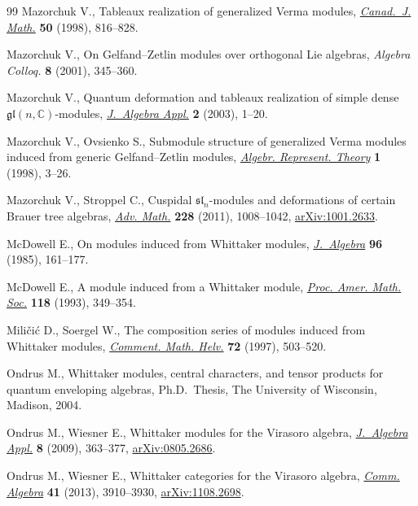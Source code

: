 \documentclass[pdftex]{sigma}
\begin{document}
\begin{thebibliography}{99}
Mazorchuk V., Tableaux realization of generalized {V}erma modules,
  \href{http://dx.doi.org/10.4153/CJM-1998-043-x}{\textit{Canad.~J. Math.}} \textbf{50} (1998), 816--828.

Mazorchuk V., On {G}elfand--{Z}etlin modules over orthogonal {L}ie algebras,
  \textit{Algebra Colloq.} \textbf{8} (2001), 345--360.

Mazorchuk V., Quantum deformation and tableaux realization of simple dense
  {${\mathfrak{gl}}(n,{\mathbb C})$}-modules, \href{http://dx.doi.org/10.1142/S0219498803000325}{\textit{J.~Algebra Appl.}}
  \textbf{2} (2003), 1--20.

Mazorchuk V., Ovsienko S., Submodule structure of generalized {V}erma modules
  induced from generic {G}elfand--{Z}etlin modules, \href{http://dx.doi.org/10.1023/A:1009929615175}{\textit{Algebr. Represent.
  Theory}} \textbf{1} (1998), 3--26.

Mazorchuk V., Stroppel C., Cuspidal {${\mathfrak{sl}}_n$}-modules and
  deformations of certain {B}rauer tree algebras, \href{http://dx.doi.org/10.1016/j.aim.2011.06.005}{\textit{Adv. Math.}}
  \textbf{228} (2011), 1008--1042, \href{http://arxiv.org/abs/1001.2633}{arXiv:1001.2633}.

McDowell E., On modules induced from {W}hittaker modules, \href{http://dx.doi.org/10.1016/0021-8693(85)90044-4}{\textit{J.~Algebra}}
  \textbf{96} (1985), 161--177.

McDowell E., A module induced from a {W}hittaker module, \href{http://dx.doi.org/10.2307/2160308}{\textit{Proc. Amer.
  Math. Soc.}} \textbf{118} (1993), 349--354.

Mili{\v{c}}i{\'c} D., Soergel W., The composition series of modules induced
  from {W}hittaker modules, \href{http://dx.doi.org/10.1007/s000140050031}{\textit{Comment. Math. Helv.}} \textbf{72} (1997),
  503--520.

Ondrus M., Whittaker modules, central characters, and tensor products for
  quantum enveloping algebras, Ph.D.~Thesis, The University of Wisconsin,
  Madison, 2004.

Ondrus M., Wiesner E., Whittaker modules for the {V}irasoro algebra,
  \href{http://dx.doi.org/10.1142/S0219498809003370}{\textit{J.~Algebra Appl.}} \textbf{8} (2009), 363--377, \href{http://arxiv.org/abs/0805.2686}{arXiv:0805.2686}.

Ondrus M., Wiesner E., Whittaker categories for the {V}irasoro algebra,
  \href{http://dx.doi.org/10.1080/00927872.2012.693557}{\textit{Comm. Algebra}} \textbf{41} (2013), 3910--3930, \href{http://arxiv.org/abs/1108.2698}{arXiv:1108.2698}.


\end{thebibliography}
\end{document}
